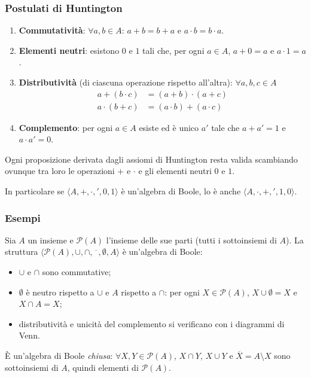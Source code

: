 \documentclass[11pt,a4paper]{article}
\begin{document}
\subsubsection{Postulati di Huntington}

\begin{enumerate}
    \item \textbf{Commutatività}: $\forall a, b \in A$:
          $a + b = b + a$ \quad e \quad $a \cdot b = b \cdot a$.
    \item \textbf{Elementi neutri}: esistono $0$ e $1$ tali che, per ogni
          $a \in A$, $a + 0 = a$ e $a \cdot 1 = a$.
    \item \textbf{Distributività} (di ciascuna operazione rispetto all'altra):
          $\forall a, b, c \in A$
          \begin{align*}
            a + (b \cdot c) &= (a + b) \cdot (a + c)\\
            a \cdot (b + c) &= (a \cdot b) + (a \cdot c)
          \end{align*}
    \item \textbf{Complemento}: per ogni $a \in A$ esiste ed è unico $a'$ tale
          che $a + a' = 1$ e $a \cdot a' = 0$.
\end{enumerate}

\begin{teorema}
Ogni proposizione derivata dagli assiomi di Huntington resta valida scambiando
ovunque tra loro le operazioni $+$ e $\cdot$ e gli elementi neutri $0$ e $1$.
\end{teorema}

\begin{osservazione}
In particolare se $\langle A, +, \cdot, ', 0, 1 \rangle$ è un'algebra di Boole,
lo è anche $\langle A, \cdot, +, ', 1, 0 \rangle$.
\end{osservazione}

\subsubsection{Esempi}

\begin{esempio}
Sia $A$ un insieme e $\mathcal{P}(A)$ l'insieme delle sue parti (tutti i
sottoinsiemi di $A$). La struttura
$\langle \mathcal{P}(A), \cup, \cap, \overline{\phantom{x}}, \emptyset, A \rangle$
è un'algebra di Boole:
\begin{itemize}
    \item $\cup$ e $\cap$ sono commutative;
    \item $\emptyset$ è neutro rispetto a $\cup$ e $A$ rispetto a $\cap$:
          per ogni $X \in \mathcal{P}(A)$, $X \cup \emptyset = X$ e
          $X \cap A = X$;
    \item distributività e unicità del complemento si verificano con i
          diagrammi di Venn.
\end{itemize}
È un'algebra di Boole \emph{chiusa}: $\forall X, Y \in \mathcal{P}(A)$,
$X \cap Y$, $X \cup Y$ e $\overline{X} = A \setminus X$ sono sottoinsiemi di $A$,
quindi elementi di $\mathcal{P}(A)$.
\end{esempio}
\end{document}
